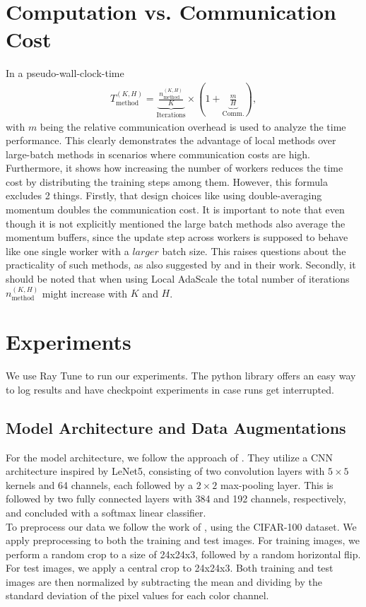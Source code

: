 \documentclass[10pt,twocolumn,letterpaper]{article}
\begin{document}
\section{Computation vs. Communication Cost}
In \cite{BALLES2024P} a pseudo-wall-clock-time
\begin{align*}
    T_{\text {method }}^{(K, H)}= \underbrace{\frac{n_{\text {method }}^{(K, H)}}{K}}_\text{Iterations} \times(1+ \underbrace{\frac{m}{H}}_\text{Comm.}),
\end{align*}
with $m$ being the relative communication overhead is used to analyze the time performance. This clearly demonstrates the advantage of local methods over large-batch methods in scenarios where communication costs are high. Furthermore, it shows how increasing the number of workers reduces the time cost by distributing the training steps among them.
However, this formula excludes 2 things. Firstly, that design choices like using double-averaging momentum doubles the communication cost. It is important to note that even though it is not explicitly mentioned the large batch methods also average the momentum buffers, since the update step across workers is supposed to behave like one single worker with a $\textit{larger}$ batch size. This raises questions about the practicality of such methods, as also suggested by \cite{lin2020dontuselargeminibatches} and \cite{BALLES2024P} in their work.
Secondly, it should be noted that when using Local AdaScale the total number of iterations $n_{\text {method }}^{(K, H)}$ might increase with $K$ and $H$.

\section{Experiments}
We use Ray Tune to run our experiments. The python library offers an easy way to log results and have checkpoint experiments in case runs get interrupted.
\subsection{Model Architecture and Data Augmentations}
For the model architecture, we follow the approach of \cite{hsu2020federatedvisualclassificationrealworld}. They utilize a CNN architecture inspired by LeNet5, consisting of two convolution layers with $5 \times 5$ kernels and 64 channels, each followed by a $2 \times 2$ max-pooling layer. This is followed by two fully connected layers with 384 and 192 channels, respectively, and concluded with a softmax linear classifier.\\
To preprocess our data we follow the work of \cite{reddi2021adaptivefederatedoptimization}, using the CIFAR-100 dataset.
We apply preprocessing to both the training and test images. For training images, we perform a random crop to a size of 24x24x3, followed by a random horizontal flip. For test images, we apply a central crop to 24x24x3. Both training and test images are then normalized by subtracting the mean and dividing by the standard deviation of the pixel values for each color channel.
\end{document}

